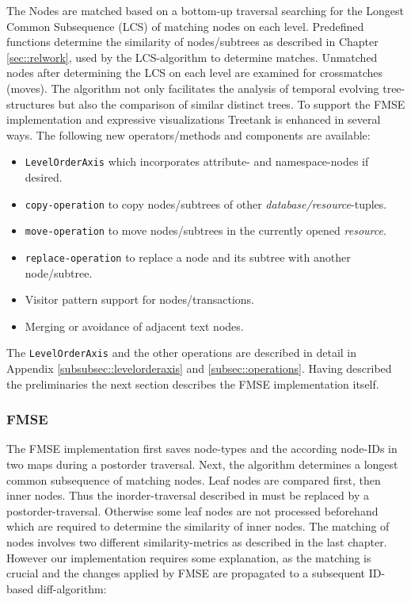 The Nodes are matched based on a bottom-up traversal searching for the Longest Common Subsequence (LCS) of matching nodes on each level. Predefined functions determine the similarity of nodes/subtrees as described in Chapter \ref{sec::relwork}, used by the LCS-algorithm to determine matches. Unmatched nodes after determining the LCS on each level are examined for crossmatches (moves). The algorithm not only facilitates the analysis of temporal evolving tree-structures but also the comparison of similar distinct trees. To support the FMSE implementation and expressive visualizations Treetank is enhanced in several ways. The following new operators/methods and components are available:

\begin{itemize}
\item \texttt{LevelOrderAxis} which incorporates attribute- and namespace-nodes if desired.
\item \texttt{copy-operation} to copy nodes/subtrees of other \emph{database/resource}-tuples.
\item \texttt{move-operation} to move nodes/subtrees in the currently opened \emph{resource}.
\item \texttt{replace-operation} to replace a node and its subtree with another node/subtree.
\item Visitor pattern support for nodes/transactions.
\item Merging or avoidance of adjacent text nodes.
\end{itemize}

The \texttt{LevelOrderAxis} and the other operations are described in detail in Appendix \ref{subsubsec::levelorderaxis} and \ref{subsec::operations}. Having described the preliminaries the next section describes the FMSE implementation itself.

\subsubsection{FMSE} The FMSE implementation first saves node-types and the according node-IDs in two maps during a postorder traversal. Next, the algorithm determines a longest common subsequence of matching nodes. Leaf nodes are compared first, then inner nodes. Thus the inorder-traversal described in \cite{chawathe1996change} must be replaced by a postorder-traversal. Otherwise some leaf nodes are not processed beforehand which are required to determine the similarity of inner nodes. The matching of nodes involves two different similarity-metrics as described in the last chapter. However our implementation requires some explanation, as the matching is crucial and the changes applied by FMSE are propagated to a subsequent ID-based diff-algorithm:

